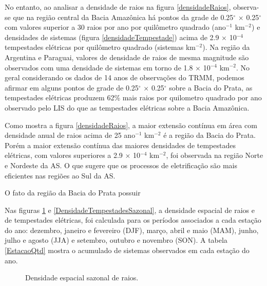 No entanto, ao analisar a densidade de raios na figura \ref{densidadeRaios}, observa-se que na região central da Bacia Amazônica há pontos da grade de 0.25$^{\circ}$ $\times$ 0.25$^{\circ}$ com valores superior a 30 raios por ano por quilômetro quadrado (ano$^{-1}$ km$^{-2}$) e densidades de sistemas (figura \ref{densidadeTempestade}) acima de 2.9 $\times$ 10$^{-4}$ tempestades elétricas por quilômetro quadrado (sistemas km$^{-2}$). Na região da Argentina e Paraguai, valores de densidade de raios de mesma magnitude são observados com uma densidade de sistemas em torno de 1.8 $\times$ 10$^{-4}$ km$^{-2}$. No geral considerando os dados de 14 anos de observações do TRMM, podemos afirmar em alguns pontos de grade de 0.25$^{\circ}$ $\times$ 0.25$^{\circ}$ sobre a Bacia do Prata, as tempestades elétricas produzem 62\% mais raios por quilometro quadrado por ano observado pelo LIS do que as tempestades elétricas sobre a Bacia Amazônica. 

Como mostra a figura \ref{densidadeRaios}, a maior extensão contínua em área com densidade anual de raios acima de 25 ano$^{-1}$ km$^{-2}$ é a região da Bacia do Prata. Porém a maior extensão contínua das maiores densidades de  tempestades elétricas, com valores superiores a 2.9 $\times$ 10$^{-4}$ km$^{-2}$, foi observada na região Norte e Nordeste da AS. O que sugere que os processos de eletrificação são mais eficientes nas regiões ao Sul da AS.


O fato da região da Bacia do Prata possuir 



Nas figuras \ref{TaxaFlash} e \ref{DensidadeTempestadesSazonal}, a densidade espacial de raios e de tempestades elétricas, foi calculada para os períodos associados a cada estação do ano: dezembro, janeiro e fevereiro (DJF), março, abril e maio (MAM), junho, julho e agosto (JJA) e setembro, outubro e novembro (SON). A tabela \ref{EstacaoQtd} mostra o acumulado de sistemas observados em cada estação do ano.


\begin{figure}[!ht]
  \caption{Densidade espacial sazonal de raios.} 
\label{TaxaFlash}
\end{figure} 


